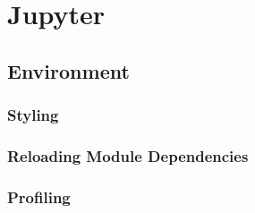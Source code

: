 \section{Jupyter}

\subsection{Environment}

\subsubsection{Styling}


\subsubsection{Reloading Module Dependencies}

\subsubsection{Profiling}